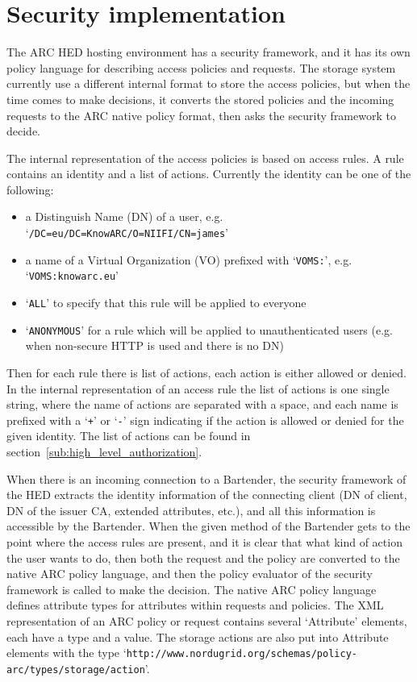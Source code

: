 \documentclass{book}
\begin{document}



\section{Security implementation} %
\label{sec:security_implementation}

The ARC HED hosting environment has a security framework, and it has its own policy language for describing access policies and requests. The storage system currently use a different internal format to store the access policies, but when the time comes to make decisions, it converts the stored policies and the incoming requests to the ARC native policy format, then asks the security framework to decide.

The internal representation of the access policies is based on access rules. A rule contains an identity and a list of actions. Currently the identity can be one of the following:
\begin{itemize}
    \item a Distinguish Name (DN) of a user, e.g. `\verb!/DC=eu/DC=KnowARC/O=NIIFI/CN=james!'
    \item a name of a Virtual Organization (VO) prefixed with `\verb!VOMS:!', e.g. `\verb!VOMS:knowarc.eu!'
    \item `\verb!ALL!' to specify that this rule will be applied to everyone
    \item `\verb!ANONYMOUS!' for a rule which will be applied to unauthenticated users (e.g. when non-secure HTTP is used and there is no DN)
\end{itemize}

Then for each rule there is list of actions, each action is either allowed or denied. In the internal representation of an access rule the list of actions is one single string, where the name of actions are separated with a space, and each name is prefixed with a `\verb!+!' or `\verb!-!' sign indicating if the action is allowed or denied for the given identity. The list of actions can be found in section~\ref{sub:high_level_authorization}.

When there is an incoming connection to a Bartender, the security framework of the HED extracts the identity information of the connecting client (DN of client, DN of the issuer CA, extended attributes, etc.), and all this information is accessible by the Bartender. When the given method of the Bartender gets to the point where the access rules are present, and it is clear that what kind of action the user wants to do, then both the request and the policy are converted to the native ARC policy language, and then the policy evaluator of the security framework is called to make the decision. The native ARC policy language defines attribute types for attributes within requests and policies. The XML representation of an ARC policy or request contains several `Attribute' elements, each have a type and a value. The storage actions are also put into Attribute elements with the type `\verb!http://www.nordugrid.org/schemas/policy-arc/types/storage/action!'.
\end{document}
